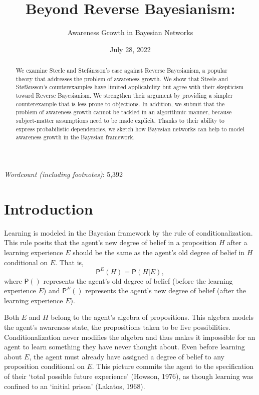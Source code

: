 \documentclass[
  11pt,
  dvipsnames,enabledeprecatedfontcommands]{scrartcl}
\title{Beyond Reverse Bayesianism:}
\subtitle{Awareness Growth in Bayesian Networks}
\author{}
\date{\vspace{-2.5em}July 28, 2022}
\newcommand{\pr}[1]{\ensuremath{\mathsf{P}(#1)}}
\newcommand{\ppr}[2]{\ensuremath{\mathsf{P}^{#1}(#2)}}
\begin{document}
\maketitle

\doublespace

\emph{Wordcount (including footnotes)}: 5,392

\begin{abstract}
We examine Steele and Stefánsson's case against Reverse Bayesianism, a popular theory 
that addresses the problem of awareness growth. We show that Steele and Stefánsson's counterexamples have limited applicability but agree with their skepticism toward Reverse Bayesianism. We strengthen their argument by providing a simpler counterexample that is less prone to objections. In addition, we submit that the problem of awareness growth cannot be tackled in an algorithmic manner, because subject-matter assumptions need to be made explicit. Thanks to their ability to express probabilistic dependencies, we sketch how Bayesian networks can help to model awareness growth in the Bayesian framework. 
\end{abstract}

\doublespace
\linenumbers

\hypertarget{introduction}{%
\section{Introduction}\label{introduction}}

Learning is modeled in the Bayesian framework by the rule of
conditionalization. This rule posits that the agent's new degree of
belief in a proposition \(H\) after a learning experience \(E\) should
be the same as the agent's old degree of belief in \(H\) conditional on
\(E\). That is, \[\ppr{E}{H}=\pr{H \vert E},\] where \(\pr{}\)
represents the agent's old degree of belief (before the learning
experience \(E\)) and \(\ppr{E}{}\) represents the agent's new degree of
belief (after the learning experience \(E\)).

Both \(E\) and \(H\) belong to the agent's algebra of propositions. This
algebra models the agent's awareness state, the propositions taken to be
live possibilities. Conditionalization never modifies the algebra and
thus makes it impossible for an agent to learn something they have never
thought about. Even before learning about \(E\), the agent must already
have assigned a degree of belief to any proposition conditional on
\(E\). This picture commits the agent to the specification of their
`total possible future experience' (Howson, 1976), as though learning
was confined to an `initial prison' (Lakatos, 1968).
\end{document}
